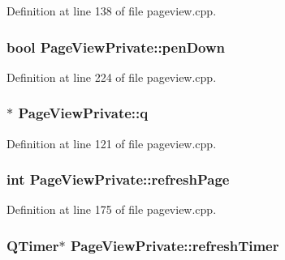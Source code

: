 Definition at line 138 of file pageview.\+cpp.

\hypertarget{classPageViewPrivate_ae7a7857d6dac44fa07cb314a6f239df1}{
\subsubsection[{pen\+Down}]{\setlength{\rightskip}{0pt plus 5cm}bool Page\+View\+Private\+::pen\+Down}}\label{classPageViewPrivate_ae7a7857d6dac44fa07cb314a6f239df1}


Definition at line 224 of file pageview.\+cpp.

\hypertarget{classPageViewPrivate_a1473b2996b01fd6306734152b4681ba0}{
\subsubsection[{q}]{$\ast$ Page\+View\+Private\+::q}}\label{classPageViewPrivate_a1473b2996b01fd6306734152b4681ba0}


Definition at line 121 of file pageview.\+cpp.

\hypertarget{classPageViewPrivate_a840db896fe007ae5df6cfa907cba6409}{
\subsubsection[{refresh\+Page}]{\setlength{\rightskip}{0pt plus 5cm}int Page\+View\+Private\+::refresh\+Page}}\label{classPageViewPrivate_a840db896fe007ae5df6cfa907cba6409}


Definition at line 175 of file pageview.\+cpp.

\hypertarget{classPageViewPrivate_a1bfeacfe84200c82984784fb057eee64}{
\subsubsection[{refresh\+Timer}]{\setlength{\rightskip}{0pt plus 5cm}Q\+Timer$\ast$ Page\+View\+Private\+::refresh\+Timer}}\label{classPageViewPrivate_a1bfeacfe84200c82984784fb057eee64}


